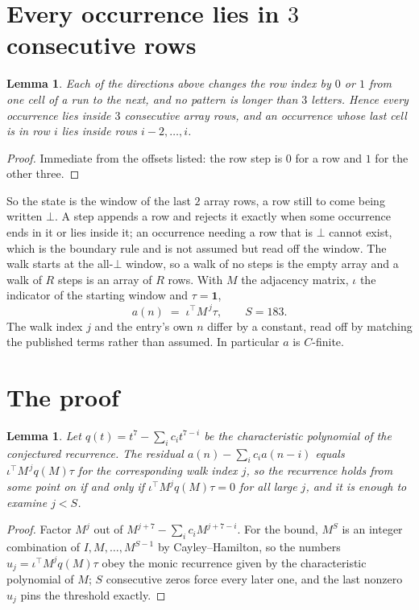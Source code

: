 \documentclass[11pt,a4paper]{article}
\theoremstyle{plain}
\newtheorem{lemma}[theorem]{Lemma}
\theoremstyle{definition}
\begin{document}
\section{Every occurrence lies in $3$ consecutive rows}

\begin{lemma}\label{lem:win}
Each of the directions above changes the row index by $0$ or $1$ from one cell of a run to the
next, and no pattern is longer than $3$ letters. Hence every occurrence lies inside $3$
consecutive array rows, and an occurrence whose last cell is in row $i$ lies inside rows
$i-2,\dots,i$.
\end{lemma}

\begin{proof}
Immediate from the offsets listed: the row step is $0$ for a row and $1$ for the other three.
\end{proof}

So the state is the window of the last $2$ array rows, a row still to come being written
$\bot$. A step appends a row and rejects it exactly when some occurrence ends in it or lies
inside it; an occurrence needing a row that is $\bot$ cannot exist, which is the boundary rule
and is not assumed but read off the window. The walk starts at the all-$\bot$ window, so a walk
of no steps is the empty array and a walk of $R$ steps is an array of $R$ rows. With $M$ the
adjacency matrix, $\iota$ the indicator of the starting window and $\tau=\mathbf{1}$,
\[
a(n)\;=\;\iota^{\!\top}M^{\,j}\tau ,\qquad S=183.
\]
The walk index $j$ and the entry's own $n$ differ by a constant, read off by matching the
published terms rather than assumed. In particular $a$ is $C$-finite.

\section{The proof}

\begin{lemma}\label{lem:crit}
Let $q(t)=t^{7}-\sum_i c_it^{7-i}$ be the characteristic polynomial of the
conjectured recurrence. The residual $a(n)-\sum_ic_ia(n-i)$ equals
$\iota^{\!\top}M^{\,j}q(M)\tau$ for the corresponding walk index $j$, so the recurrence
holds from some point on if and only if $\iota^{\!\top}M^{j}q(M)\tau=0$ for all large $j$,
and it is enough to examine $j<S$.
\end{lemma}

\begin{proof}
Factor $M^{j}$ out of $M^{j+7}-\sum_ic_iM^{j+7-i}$. For the bound, $M^{S}$
is an integer combination of $I,M,\dots,M^{S-1}$ by Cayley--Hamilton, so the numbers
$u_j=\iota^{\!\top}M^{j}q(M)\tau$ obey the monic recurrence given by the characteristic
polynomial of $M$; $S$ consecutive zeros force every later one, and the last nonzero $u_j$
pins the threshold exactly.
\end{proof}
\end{document}
